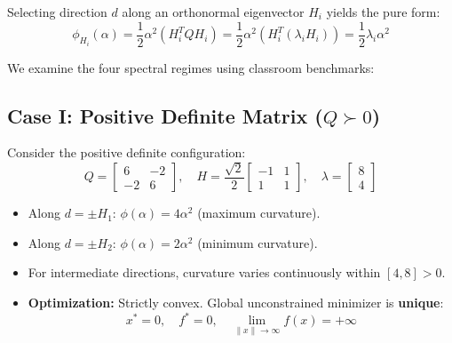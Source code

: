 Selecting direction $d$ along an orthonormal eigenvector $H_i$ yields the pure form:
\begin{equation}
\phi_{H_i}(\alpha) = \frac{1}{2} \alpha^2 (H_i^T Q H_i) = \frac{1}{2} \alpha^2 (H_i^T (\lambda_i H_i)) = \frac{1}{2} \lambda_i \alpha^2
\end{equation}

We examine the four spectral regimes using classroom benchmarks:

\subsection{Case I: Positive Definite Matrix (\texorpdfstring{$Q \succ 0$}{Q > 0})}
Consider the positive definite configuration:
\begin{equation}
Q = \begin{bmatrix} 6 & -2 \\ -2 & 6 \end{bmatrix}, \quad H = \frac{\sqrt{2}}{2} \begin{bmatrix} -1 & 1 \\ 1 & 1 \end{bmatrix}, \quad \lambda = \begin{bmatrix} 8 \\ 4 \end{bmatrix}
\end{equation}
\begin{itemize}
    \item Along $d = \pm H_1$: $\phi(\alpha) = 4\alpha^2$ (maximum curvature).
    \item Along $d = \pm H_2$: $\phi(\alpha) = 2\alpha^2$ (minimum curvature).
    \item For intermediate directions, curvature varies continuously within $[4, 8] > 0$.
    \item \textbf{Optimization:} Strictly convex. Global unconstrained minimizer is \textbf{unique}:
    \begin{equation}
    x^* = 0, \quad f^* = 0, \quad \lim_{\|x\| \to \infty} f(x) = +\infty
    \end{equation}
\end{itemize}

